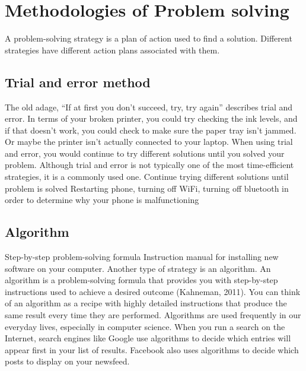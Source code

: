 \documentclass[oneside,a4paper,12pt]{book}
\begin{document}
\section{Methodologies of Problem solving}
A problem-solving strategy is a plan of action used to find a solution. Different strategies have different action plans associated with them. \subsection{Trial and error method}
The old adage, “If at first you don’t succeed, try, try again” describes trial and error. In terms of your broken printer, you could try checking the ink levels, and if that doesn’t work, you could check to make sure the paper tray isn’t jammed. Or maybe the printer isn’t actually connected to your laptop. When using trial and error, you would continue to try different solutions until you solved your problem. Although trial and error is not typically one of the most time-efficient strategies, it is a commonly used one. Continue trying different solutions until problem is solved	Restarting phone, turning off WiFi, turning off bluetooth in order to determine why your phone is malfunctioning

\subsection{Algorithm}	
Step-by-step problem-solving formula	Instruction manual for installing new software on your computer. Another type of strategy is an algorithm. An algorithm is a problem-solving formula that provides you with step-by-step instructions used to achieve a desired outcome (Kahneman, 2011). You can think of an algorithm as a recipe with highly detailed instructions that produce the same result every time they are performed. Algorithms are used frequently in our everyday lives, especially in computer science. When you run a search on the Internet, search engines like Google use algorithms to decide which entries will appear first in your list of results. Facebook also uses algorithms to decide which posts to display on your newsfeed.
\end{document}
